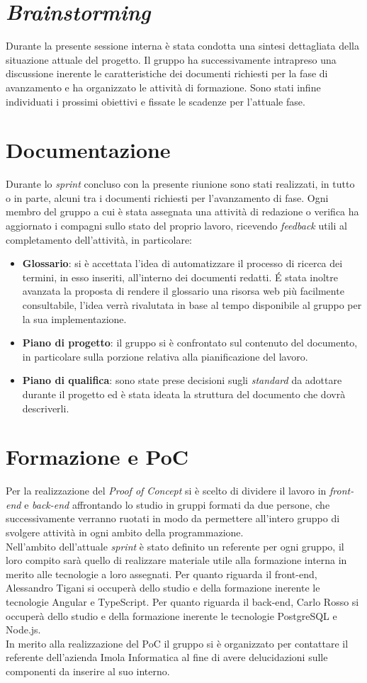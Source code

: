 \section{\textit{Brainstorming}}
Durante la presente sessione interna è stata condotta una sintesi dettagliata della situazione attuale del progetto. 
Il gruppo ha successivamente intrapreso una discussione inerente le caratteristiche dei documenti richiesti per la fase di avanzamento e ha organizzato le attività di formazione.
Sono stati infine individuati i prossimi obiettivi e fissate le scadenze per l'attuale fase.

\section{Documentazione}
Durante lo \textit{sprint} concluso con la presente riunione sono stati realizzati, in tutto o in parte, alcuni tra i documenti richiesti per l'avanzamento di fase.
Ogni membro del gruppo a cui è stata assegnata una attività di redazione o verifica ha aggiornato i compagni sullo stato del proprio lavoro, ricevendo \textit{feedback} utili al completamento dell'attività, in particolare: 
\begin{itemize}
	\item \textbf{Glossario}: si è accettata l'idea di automatizzare il processo di ricerca dei termini, in esso inseriti, all'interno dei documenti redatti. \'E stata inoltre avanzata la proposta di rendere il glossario una risorsa web più facilmente consultabile, l'idea verrà rivalutata in base  al tempo disponibile al gruppo per la sua implementazione.
	\item \textbf{Piano di progetto}: il gruppo si è confrontato sul contenuto del documento, in particolare sulla porzione relativa alla pianificazione del lavoro.
	\item \textbf{Piano di qualifica}: sono state prese decisioni sugli \textit{standard} da adottare durante il progetto ed è stata ideata la struttura del documento che dovrà descriverli.
\end{itemize}


\section{Formazione e PoC}
Per la realizzazione del \textit{Proof of Concept} si è scelto di dividere il lavoro in \textit{front-end} e \textit{back-end}
affrontando lo studio in gruppi formati da due persone, che successivamente verranno ruotati in modo da permettere all'intero gruppo di svolgere attività in ogni ambito della programmazione.\\
Nell'ambito dell'attuale \textit{sprint} è stato definito un referente per ogni gruppo, il loro compito sarà quello di realizzare materiale utile alla formazione interna in merito alle tecnologie a loro assegnati.
Per quanto riguarda il front-end, Alessandro Tigani si occuperà dello studio e della formazione inerente le tecnologie Angular e TypeScript.
Per quanto riguarda il back-end, Carlo Rosso si occuperà dello studio e della formazione inerente le tecnologie PostgreSQL e Node.js.\\

In merito alla realizzazione del PoC il gruppo si è organizzato per contattare il referente dell'azienda Imola Informatica al fine di avere delucidazioni sulle componenti da inserire al suo interno.


